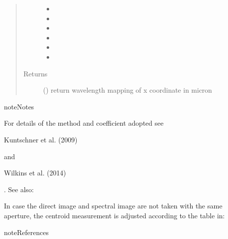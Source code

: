 \documentclass[a4paper,10pt,english]{sphinxmanual}
\begin{document}
\begin{fulllineitems}
\begin{fulllineitems}
\begin{quote}
\begin{description}
\begin{itemize}
\item {} 
 \textendash{} 

\item {} 
 \textendash{} 

\item {} 
 \textendash{} 

\item {} 
 \textendash{} 

\item {} 
 \textendash{} 

\item {} 
 \textendash{} 

\end{itemize}

\item[{Returns}] \leavevmode
{} () \textendash{} return wavelength mapping of x coordinate in micron

\end{description}\end{quote}

\begin{sphinxadmonition}{note}{Notes}

For details of the method and coefficient adopted see %
\begin{footnote}[1]\sphinxAtStartFootnote
Kuntschner et al. (2009)
%
\end{footnote} and %
\begin{footnote}[2]\sphinxAtStartFootnote
Wilkins et al. (2014)
%
\end{footnote}.
See also:
\begin{quote}

\end{quote}

In case the direct image and spectral image are not taken with the
same aperture, the centroid measurement is adjusted according to the
table in:
\begin{quote}

\end{quote}
\end{sphinxadmonition}

\begin{sphinxadmonition}{note}{References}
\end{sphinxadmonition}

\end{fulllineitems}


\end{fulllineitems}
\end{document}
